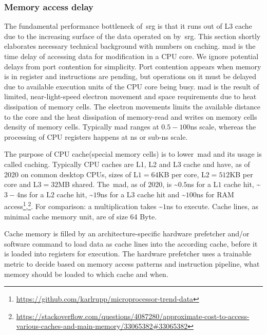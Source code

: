 \documentclass{article}
\begin{document}
\subsubsection{Memory access delay}\label{subsubsec:cacheeffects}
The fundamental performance bottleneck of~\ac{srg} is that it runs out of L3 cache due to the increasing surface of the data operated on by~\ac{srg}.
This section shortly elaborates necessary technical background with numbers on caching.
\Ac{mad} is the time delay of accessing data for modification in a CPU core. 
We ignore potential delays from port contention for simplicity.
Port contention appears when memory is in register and instructions are pending, but operations on it must be delayed due to available execution units of the CPU core being busy.
\Ac{mad} is the result of limited, near-light-speed electron movement and space requirements due to heat dissipation of memory cells.
The electron movements limits the available distance to the core and the heat dissipation of memory-read and writes on memory cells density of memory cells.
Typically \Ac{mad} ranges at $0.5-100$\ac{ns} scale, whereas the processing of CPU registers happens at \ac{ns} or sub-\ac{ns} scale.\par
The purpose of CPU cache(special memory cells) is to lower~\ac{mad} and its usage is called caching.
Typically CPU caches are L1, L2 and L3 cache and have, as of 2020 on common desktop CPUs, sizes of L$1=64$KB per core, L$2=512$KB per core and L$3=32$MB shared.
The~\ac{mad}, as of 2020, is \textasciitilde $0.5$\ac{ns} for a L$1$ cache hit, \textasciitilde $3-4$\ac{ns} for a L$2$ cache hit, \textasciitilde $19$\ac{ns} for a L$3$ cache hit and \textasciitilde $100$\ac{ns} for
RAM access\footnote{\url{https://github.com/karlrupp/microprocessor-trend-data}},\footnote{\url{https://stackoverflow.com/questions/4087280/approximate-cost-to-access-various-caches-and-main-memory/33065382\#33065382}}.
For comparison: a multiplication takes \textasciitilde $1$\ac{ns} to execute.
Cache lines, as minimal cache memory unit, are of size 64 Byte.
\par
Cache memory is filled by an architecture-specific hardware prefetcher and/or software command to load data as cache lines into the according cache, before it is loaded into registers for execution.
The hardware prefetcher uses a trainable metric to decide based on memory access patterns and instruction pipeline, what memory should be loaded to which cache and when.
\end{document}
